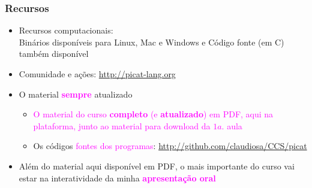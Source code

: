    
\begin{frame}[fragile]
  \frametitle{Recursos}
  \begin{itemize}
						
    \item Recursos computacionais:\\
    \pause 
    Binários disponíveis para Linux, Mac e Windows
     e Código fonte (em C) também disponível

    \item Comunidade e ações: \url{http://picat-lang.org}
    
    \pause
    \item O material \textcolor{magenta}{\textbf{sempre}} atualizado 

    \pause
    \begin{itemize}
      \item  \textcolor{magenta}{O material do curso \textbf{completo} (e \textbf{atualizado}) em PDF,
      aqui na plataforma, junto ao material para download da $1a.$ aula}
      
     \item   Os códigos \textcolor{magenta}{fontes dos programas}:  \url{http://github.com/claudiosa/CCS/picat}
    \end{itemize}

			\item Além do material aqui disponível em PDF, o mais importante  do curso
			 vai estar na interatividade
			da minha \textcolor{magenta}{\textbf{apresentação oral}} 
			
    
  \end{itemize}

\end{frame}


